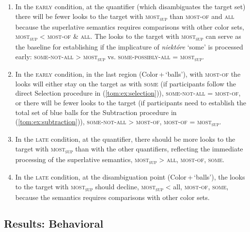 \documentclass[output=paper]{langscibook}
\begin{document}
\begin{enumerate}[label=(\roman*)]
\item In the \textsc{early} condition, at the quantifier (which disambiguates the target set) there will be fewer looks to the
target with \textsc{most\textsubscript{sup}} than \textsc{most-of} and \textsc{all} because the superlative semantics
requires comparisons with other color sets, \textsc{most\textsubscript{sup}} {\textless} \textsc{most-of} \&
\textsc{all}. The looks to the target with \textsc{most\textsubscript{sup}} can serve as the baseline for establishing if the implicature of
\textit{niektóre} `some' is processed early: \textsc{some-not-all} {\textgreater} \textsc{most\textsubscript{sup}} vs.
\textsc{some-possibly-all} = \textsc{most\textsubscript{sup}}.

\item In the \textsc{early} condition, in the last region (Color\,+\,`balls'), with \textsc{most-of} the looks will either stay on the target as with \textsc{some} (if participants follow the direct Selection procedure in (\ref{tom:ex:selection})), \textsc{some-not-all} = \textsc{most-of}, or there will be fewer looks to the target (if participants need to establish the total set of blue balls for the Subtraction procedure in (\ref{tom:ex:subtraction})), \textsc{some-not-all} {\textgreater} \textsc{most-of}, \textsc{most-of} = \textsc{most\textsubscript{sup}}.

\item In the \textsc{late} condition, at the quantifier, there should be more looks to the target with
\textsc{most\textsubscript{sup}} than with the other quantifiers, reflecting the immediate processing of the superlative
semantics, \textsc{most\textsubscript{sup}} {\textgreater} \textsc{all}, \textsc{most-of}, \textsc{some}.

\item In the \textsc{late} condition, at the disambiguation point (Color\,+\,`balls'), the looks to the target with \textsc{most\textsubscript{sup}} should decline, \textsc{most\textsubscript{sup}} {\textless} all, \textsc{most-of}, \textsc{some}, because the semantics requires comparisons with other color sets.
\end{enumerate}



\subsection{Results: Behavioral} 
\end{document}

